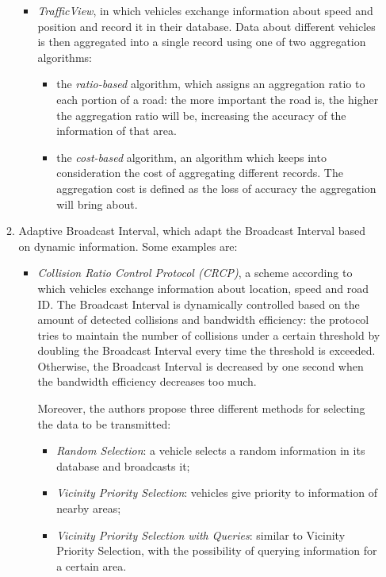 \begin{enumerate}
\begin{enumerate}
\begin{itemize}
					\item \textit{TrafficView}\cite{1263039}, in which vehicles exchange information about speed and position and record it in their database. Data about different vehicles is then aggregated into a single record using one of two aggregation algorithms:
					\begin{itemize}
						\item the \textit{ratio-based} algorithm, which assigns an aggregation ratio to each portion of a road: the more important the road is, the higher the aggregation ratio will be, increasing the accuracy of the information of that area.
						\item the \textit{cost-based} algorithm, an algorithm which keeps into consideration the cost of aggregating different records. The aggregation cost is defined as the loss of accuracy the aggregation will bring about.
					\end{itemize} 
				\end{itemize}
				\item Adaptive Broadcast Interval, which adapt the Broadcast Interval based on dynamic information. Some examples are:
				\begin{itemize}
					\renewcommand\labelitemi{--}
					
					\item \textit{Collision Ratio Control Protocol (CRCP)}\cite{4357748}, a scheme according to which vehicles exchange information about location, speed and road ID. The Broadcast Interval is dynamically controlled based on the amount of detected collisions and bandwidth efficiency: the protocol tries to maintain the number of collisions under a certain threshold by doubling the Broadcast Interval every time the threshold is exceeded. Otherwise, the Broadcast Interval is decreased by one second when the bandwidth efficiency decreases too much.
					
					Moreover, the authors propose three different methods for selecting the data to be transmitted:
					\begin{itemize}
						\item \textit{Random Selection}: a vehicle selects a random information in its database and broadcasts it;
						\item \textit{Vicinity Priority Selection}: vehicles give priority to information of nearby areas;
						\item \textit{Vicinity Priority Selection with Queries}: similar to Vicinity Priority Selection, with the possibility of querying information for a certain area.
					\end{itemize}
					

\end{itemize}
\end{enumerate}
\end{enumerate}
